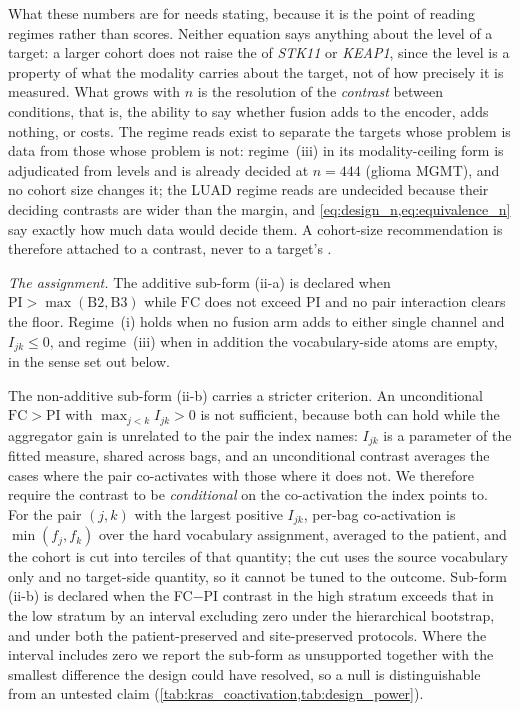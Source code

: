What these numbers are for needs stating, because it is the point of
reading regimes rather than scores. Neither equation says anything about
the level of a target: a larger cohort does not raise the \auroc{} of
\textit{STK11} or \textit{KEAP1}, since the level is a property of what
the modality carries about the target, not of how precisely it is
measured. What grows with $n$ is the resolution of the \emph{contrast}
between conditions, that is, the ability to say whether fusion adds to
the encoder, adds nothing, or costs. The regime reads exist to separate
the targets whose problem is data from those whose problem is not:
regime~(iii) in its modality-ceiling form is adjudicated from levels and
is already decided at $n\!=\!444$ (glioma MGMT), and no cohort size
changes it; the LUAD regime reads are undecided because their deciding
contrasts are wider than the margin, and \cref{eq:design_n,eq:equivalence_n}
say exactly how much data would decide them. A cohort-size
recommendation is therefore attached to a contrast, never to a target's
\auroc{}.

\emph{The assignment.} The additive sub-form (ii-a) is declared when
$\mathrm{PI}\!>\!\max(\mathrm{B2},\mathrm{B3})$ while $\mathrm{FC}$ does
not exceed $\mathrm{PI}$ and no pair interaction clears the floor.
Regime~(i) holds when no fusion arm adds to either single channel and
$I_{jk}\!\le\!0$, and regime~(iii) when in addition the vocabulary-side
atoms are empty, in the sense set out below.

The non-additive sub-form (ii-b) carries a stricter criterion. An unconditional
$\mathrm{FC}\!>\!\mathrm{PI}$ with $\max_{j<k}I_{jk}>0$ is not
sufficient, because both can hold while the aggregator gain is unrelated
to the pair the index names: $I_{jk}$ is a parameter of the fitted
measure, shared across bags, and an unconditional contrast averages the
cases where the pair co-activates with those where it does not. We
therefore require the contrast to be \emph{conditional} on the
co-activation the index points to. For the pair $(j,k)$ with the largest
positive $I_{jk}$, per-bag co-activation is $\min(f_j,f_k)$ over the hard
vocabulary assignment, averaged to the patient, and the cohort is cut
into terciles of that quantity; the cut uses the source vocabulary only
and no target-side quantity, so it cannot be tuned to the outcome.
Sub-form (ii-b) is declared when the FC${-}$PI contrast in the high
stratum exceeds that in the low stratum by an interval excluding zero
under the hierarchical bootstrap, and under both the patient-preserved
and site-preserved protocols. Where the interval includes zero we report
the sub-form as unsupported together with the smallest difference the
design could have resolved, so a null is distinguishable from an
untested claim (\cref{tab:kras_coactivation,tab:design_power}).

